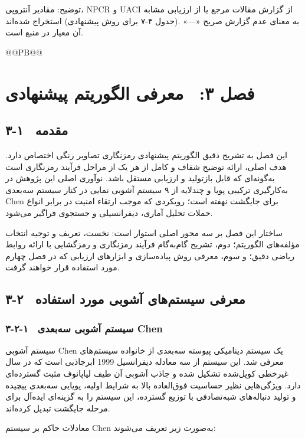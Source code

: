 توضیح: مقادیر آنتروپی، ‎NPCR‎ و ‎UACI‎ از گزارش مقالات مرجع یا از ارزیابی مشابه (جدول ۴-۷ برای روش پیشنهادی) استخراج شده‌اند. «‎---‎» به معنای عدم گزارش صریح آن معیار در منبع است.


@@PB@@







\chapter{فصل ۳:  معرفی الگوریتم پیشنهادی}
\section{۳-۱  مقدمه}

این فصل به تشریح دقیق الگوریتم پیشنهادی رمزنگاری تصاویر رنگی اختصاص دارد. هدف اصلی، ارائه توضیح شفاف و کامل از هر یک از مراحل فرآیند رمزنگاری است به‌گونه‌ای که قابل بازتولید و ارزیابی مستقل باشد. نوآوری اصلی این پژوهش در به‌کارگیری ترکیبی پویا و چندلایه از ۹ سیستم آشوبی نمایی در کنار سیستم سه‌بعدی ‎Chen‎ برای جایگشت نهفته است؛ رویکردی که موجب ارتقاء امنیت در برابر انواع حملات تحلیل آماری، دیفرانسیلی و جستجوی فراگیر می‌شود.

ساختار این فصل بر سه محور اصلی استوار است: نخست، تعریف و توجیه انتخاب مؤلفه‌های الگوریتم؛ دوم، تشریح گام‌به‌گام فرآیند رمزنگاری و رمزگشایی با ارائه روابط ریاضی دقیق؛ و سوم، معرفی روش پیاده‌سازی و ابزارهای ارزیابی که در فصل چهارم مورد استفاده قرار خواهند گرفت.

\section{۳-۲  معرفی سیستم‌های آشوبی مورد استفاده}

\subsection{۳-۲-۱  سیستم آشوبی سه‌بعدی ‎Chen‎}

سیستم آشوبی ‎Chen‎  \cite{ref6} یک سیستم دینامیکی پیوسته سه‌بعدی از خانواده سیستم‌های ابرجاذبی است که در سال ‎1999‎ معرفی شد. این سیستم از سه معادله دیفرانسیل غیرخطی کوپل‌شده تشکیل شده و جاذب آشوبی آن طیف لیاپانوف مثبت گسترده‌ای دارد. ویژگی‌هایی نظیر حساسیت فوق‌العاده بالا به شرایط اولیه، پویایی سه‌بعدی پیچیده و تولید دنباله‌های شبه‌تصادفی با توزیع گسترده، این سیستم را به گزینه‌ای ایده‌آل برای مرحله جایگشت تبدیل کرده‌اند.

معادلات حاکم بر سیستم ‎Chen‎ به‌صورت زیر تعریف می‌شوند:


